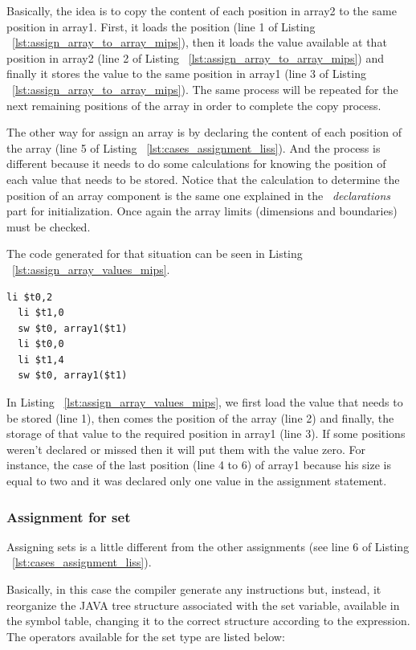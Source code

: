 \documentclass[
  oneside,
  11pt, a4paper,
  footinclude=true,
  headinclude=true,
  cleardoublepage=empty
]{scrbook}
\begin{document}
Basically, the idea is to copy the content of each position in array2 to the same position in array1. First, it loads the position (line 1 of Listing ~\ref{lst:assign_array_to_array_mips}), then it loads the value available at that position in array2 (line 2 of Listing ~\ref{lst:assign_array_to_array_mips}) and finally it stores the value to the same position in array1 (line 3 of Listing ~\ref{lst:assign_array_to_array_mips}). The same process will be repeated for the next remaining positions of the array in order to complete the copy process.

The other way for assign an array is by declaring the content of each position of the array (line 5 of Listing ~\ref{lst:cases_assignment_liss}).
And the process is different because it needs to do some calculations for knowing the position of each value that needs to be stored. Notice that the calculation to determine the position of an array component is the same one explained in the ~\textit{declarations} part for initialization.
Once again the array limits (dimensions and boundaries) must be checked.

The code generated for that situation can be seen in Listing ~\ref{lst:assign_array_values_mips}.

\begin{lstlisting}[caption={Code generated for line 5 of Listing ~\ref{lst:cases_assignment_liss}},label={lst:assign_array_values_mips}]
  li $t0,2		
  li $t1,0		
  sw $t0, array1($t1)		
  li $t0,0		
  li $t1,4		
  sw $t0, array1($t1)		
\end{lstlisting}

In Listing ~\ref{lst:assign_array_values_mips}, we first load the value that needs to be stored (line 1), then comes the position of the array (line 2) and finally, the storage of that value to the required position in array1 (line 3). If some positions weren't declared or missed then it will put them with the value zero. For instance, the case of the last position (line 4 to 6) of array1 because his size is equal to two and it was declared only one value in the assignment statement.

\subsubsection{Assignment for set}

Assigning sets is a little different from the other assignments (see line 6 of Listing ~\ref{lst:cases_assignment_liss}).

Basically, in this case the compiler generate any instructions but, instead, it reorganize the JAVA tree structure associated with the set variable, available in the symbol table, changing it to the correct structure according to the expression.
The operators available for the set type are listed below:
\end{document}
